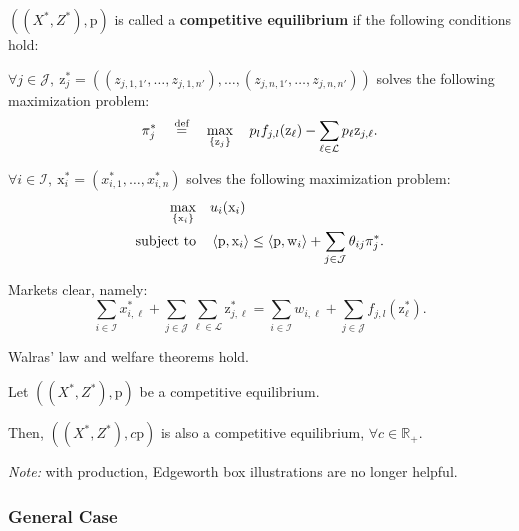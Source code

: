 \documentclass[8pt,a4paper]{extarticle}
\begin{document}
\begin{multicols}{3}
  \begin{boxdef}
    $\left( (X^*,Z^*),\mathrm{p} \right)$ is called a \textbf{competitive equilibrium} if the following conditions hold:
    \begin{eqlist}
      \item $\forall j \in \mathcal{J},\ \mathrm{z}^*_j = ((z_{j,1,1'},\dots,z_{j,1,n'}),\dots,(z_{j,n,1'},\dots,z_{j,n,n'}))$ solves the following maximization problem: 
      \[\pi^*_j \quad \stackrel{\text{\normalfont def}}{=} \quad \max_{\left\{ \mathrm{z}_j \right\}} \quad p_l f_{j,l}(\mathrm{z}_\ell) - \sum_{\ell\in\mathcal{L}} p_\ell \mathrm{z}_{j,\ell}.\]
      \item $\forall i \in \mathcal{I},\ \mathrm{x}^*_i = (x^*_{i,1}, \dots, x^*_{i,n})$ solves the following maximization problem:
      \begin{equation*}
        \begin{aligned}
          \max_{\{\mathrm{x}_i\}}\quad        & u_i(\mathrm{x}_i)                                                                             \\
          \text{\normalfont subject to} \quad & \left\langle \mathrm{p},\mathrm{x}_i \right\rangle \le \left\langle\mathrm{p},\mathrm{w}_i\right\rangle + \sum_{j \in \mathcal{J}} \theta_{ij} \pi^*_j.
        \end{aligned}
      \end{equation*}
      \item Markets clear, namely:
      \[\sum_{i \in \mathcal{I}} x^*_{i,\ell} + \sum_{j \in \mathcal{J}} \sum_{\ell \in \mathcal{L}} \mathrm{z}^*_{j,\ell} = \sum_{i \in \mathcal{I}} w_{i,\ell} + \sum_{j \in \mathcal{J}} f_{j,l} (\mathrm{z}^*_\ell) .\]
    \end{eqlist}
  \end{boxdef}

  \begin{boxprop}
    Walras' law and welfare theorems hold.
  \end{boxprop}

  \begin{boxprop}
    Let $((X^*,Z^*),\mathrm{p})$ be a competitive equilibrium. \par Then, $((X^*,Z^*), c\mathrm{p})$ is also a competitive equilibrium, $\forall c \in \mathbb{R}_+$.
  \end{boxprop}

  \emph{Note:} with production, Edgeworth box illustrations are no longer helpful.

  \subsubsection*{General Case}


\end{multicols}
\end{document}
